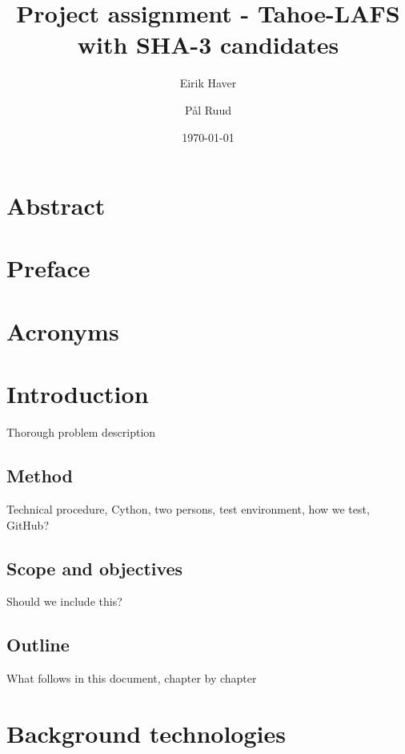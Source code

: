 \documentclass[english,12pt,a4paper]{book}
\author{Eirik Haver \and Pål Ruud}
\title{Project assignment - Tahoe-LAFS with SHA-3 candidates}
\date{\today}
\begin{document}

\pagestyle{empty}

\chapter*{Abstract}
\pagestyle{plain}
\setcounter{page}{1}

\chapter*{Preface}

\tableofcontents

\listoffigures

\listoftables

\chapter*{Acronyms}


\chapter{Introduction}
\setcounter{page}{1}

Thorough problem description

\section{Method}

Technical procedure, Cython, two persons, test environment, how we test,
GitHub?

\section{Scope and objectives}

Should we include this?

\section{Outline}

What follows in this document, chapter by chapter


\chapter{Background technologies}
\end{document}
